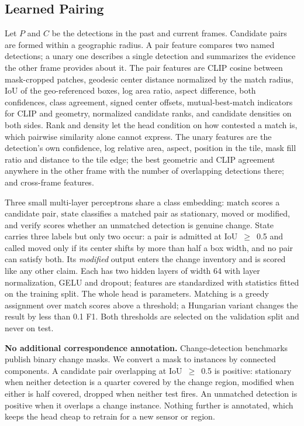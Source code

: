 \subsection{Learned Pairing}

Let $P$ and $C$ be the detections in the past and current frames. Candidate
pairs are formed within a geographic radius. A pair feature compares two named
detections; a unary one describes a single detection and summarizes the
evidence the other frame provides about it. The \NPairFeatures{} pair features are CLIP cosine
between mask-cropped patches,
geodesic center distance normalized by the match radius, IoU of the
geo-referenced boxes, log area ratio, aspect difference, both confidences,
class agreement, signed center offsets, mutual-best-match indicators for CLIP
and geometry, normalized candidate ranks, and candidate densities on both
sides. Rank and density let the head condition on how contested a match is,
which pairwise similarity alone cannot express. The \NUnaryFeatures{} unary
features are the detection's own confidence, log relative area, aspect,
position in the tile, mask fill ratio and distance to the tile edge; the best
geometric and CLIP agreement anywhere in the other frame with the number of
overlapping detections there; and \NCrossFrameFeatures{} cross-frame
features.

Three small multi-layer perceptrons share a class embedding:
$\mathrm{match}$ scores a candidate pair, $\mathrm{state}$ classifies a matched
pair as stationary, moved or modified, and $\mathrm{verify}$ scores whether an
unmatched detection is genuine change. State carries three labels but only two
occur: a pair is admitted at IoU~$\geq$~0.5 and called moved only if its center
shifts by more than half a box width, and no pair can satisfy both. Its \emph{modified} output enters the change inventory and is
scored like any other claim. Each has two hidden layers of width 64
with layer normalization, GELU and dropout; features are standardized with
statistics fitted on the training split. The whole head is \HeadParams{}
parameters. Matching is a greedy assignment over $\mathrm{match}$ scores above
a threshold; a Hungarian variant changes the result by less than 0.1 F1. Both
thresholds are selected on the validation split and never on test.

\textbf{No additional correspondence annotation.} Change-detection benchmarks publish binary change
masks. We convert a mask to instances by connected components. A candidate pair
overlapping at IoU~$\geq$~0.5 is positive: stationary when neither detection is
a quarter covered by the change region, modified when either is half covered,
dropped when neither test fires. An unmatched detection is positive when it
overlaps a change instance. Nothing further is annotated, which keeps the head
cheap to retrain for a new sensor or region.

